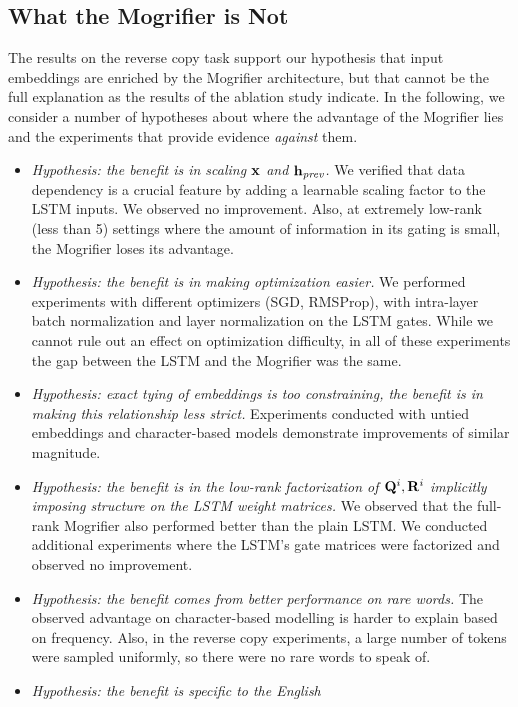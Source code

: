 \subsection{What the Mogrifier is Not}

The results on the reverse copy task support our hypothesis that input
embeddings are enriched by the Mogrifier architecture, but that cannot
be the full explanation as the results of the ablation study indicate.
%
In the following, we consider a number of hypotheses about where the
advantage of the Mogrifier lies and the experiments that provide
evidence \emph{against} them.
\begin{itemize}
\renewcommand\labelitemi{\scriptsize\Lightning}
\item \emph{Hypothesis: the benefit is in scaling $\mathbf{x}$ and
  $\mathbf{h}_{\textit{prev}}$.} We verified that data dependency is a crucial feature by
  adding a learnable scaling factor to the LSTM inputs. We observed no
  improvement. Also, at extremely low-rank (less than 5) settings
  where the amount of information in its gating is small, the
  Mogrifier loses its advantage.
\item \emph{Hypothesis: the benefit is in making optimization easier.}
  We performed experiments with different optimizers (SGD, RMSProp),
  with intra-layer batch normalization and layer normalization on the
  LSTM gates. While we cannot rule out an effect on optimization
  difficulty, in all of these experiments the gap between the LSTM and
  the Mogrifier was the same.
\item \emph{Hypothesis: exact tying of embeddings is too constraining,
  the benefit is in making this relationship less strict.} Experiments
  conducted with untied embeddings and character-based models
  demonstrate improvements of similar magnitude.
\item \emph{Hypothesis: the benefit is in the low-rank factorization
  of $\mathbf{Q}^{i}, \mathbf{R}^{i}$ implicitly imposing structure on the LSTM
  weight matrices.} We observed that the full-rank Mogrifier also
  performed better than the plain LSTM. We conducted additional
  experiments where the LSTM's gate matrices were factorized and
  observed no improvement.
\item \emph{Hypothesis: the benefit comes from better performance on
  rare words.} The observed advantage on character-based modelling is
  harder to explain based on frequency. Also, in the reverse copy
  experiments, a large number of tokens were sampled uniformly, so
  there were no rare words to speak of.
\item \emph{Hypothesis: the benefit is specific to the English
}
\end{itemize}
